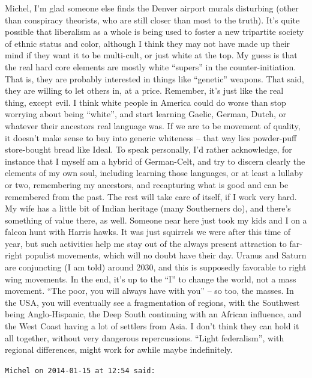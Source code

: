 \begin{footnotesize}
\begin{sffamily}
Michel, I'm glad someone else finds the Denver airport murals disturbing (other than conspiracy theorists, who are still closer than most to the truth). It's quite possible that liberalism as a whole is being used to foster a new tripartite society of ethnic status and color, although I think they may not have made up their mind if they want it to be multi-cult, or just white at the top. My guess is that the real hard core elements are mostly white ``supers'' in the counter-initiation. That is, they are probably interested in things like ``genetic'' weapons. That said, they are willing to let others in, at a price. Remember, it's just like the real thing, except evil. I think white people in America could do worse than stop worrying about being ``white'', and start learning Gaelic, German, Dutch, or whatever their ancestors real language was. If we are to be movement of quality, it doesn't make sense to buy into generic whiteness -- that way lies powder-puff store-bought bread like Ideal. To speak personally, I'd rather acknowledge, for instance that I myself am a hybrid of German-Celt, and try to discern clearly the elements of my own soul, including learning those languages, or at least a lullaby or two, remembering my ancestors, and recapturing what is good and can be remembered from the past. The rest will take care of itself, if I work very hard. My wife has a little bit of Indian heritage (many Southerners do), and there's something of value there, as well. Someone near here just took my kids and I on a falcon hunt with Harris hawks. It was just squirrels we were after this time of year, but such activities help me stay out of the always present attraction to far-right populist movements, which will no doubt have their day. Uranus and Saturn are conjuncting (I am told) around 2030, and this is supposedly favorable to right wing movements. In the end, it's up to the ``I'' to change the world, not a mass movement. ``The poor, you will always have with you'' -- so too, the masses. In the USA, you will eventually see a fragmentation of regions, with the Southwest being Anglo-Hispanic, the Deep South continuing with an African influence, and the West Coast having a lot of settlers from Asia. I don't think they can hold it all together, without very dangerous repercussions. ``Light federalism'', with regional differences, might work for awhile maybe indefinitely.

\hfill

\texttt{Michel on 2014-01-15 at 12:54 said:}


\end{sffamily}
\end{footnotesize}
